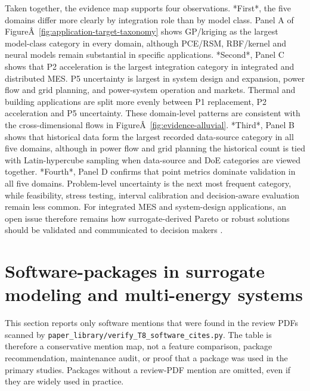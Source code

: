 \documentclass[final,5p,times,twocolumn]{elsarticle}
\begin{document}
Taken together, the evidence map supports four observations. *First*,
the five domains differ more clearly by integration role than by model
class. Panel A of
FigureÂ~\ref{fig:application-target-taxonomy} shows GP/kriging as the
largest model-class category in every domain, although PCE/RSM,
RBF/kernel and neural models remain substantial in specific
applications. *Second*, Panel C shows that P2 acceleration is the
largest integration category in integrated and distributed MES. P5
uncertainty is largest in system design and expansion, power flow and
grid planning, and power-system operation and markets. Thermal and
building applications are split more evenly between P1 replacement, P2
acceleration and P5 uncertainty. These
domain-level patterns are consistent with the cross-dimensional flows
in FigureÂ~\ref{fig:evidence-alluvial}. *Third*, Panel B shows that
historical data form the largest recorded data-source category in all
five domains, although in power flow and grid planning the historical
count is tied with Latin-hypercube sampling when data-source and DoE
categories are viewed together.
*Fourth*, Panel D confirms that point metrics dominate validation in all
five domains. Problem-level uncertainty is the next most frequent
category, while feasibility, stress testing, interval calibration and
decision-aware evaluation remain less common. For integrated MES and
system-design applications, an open issue therefore remains how
surrogate-derived Pareto or robust solutions should be validated and
communicated to decision makers
\cite{Mylonopoulos202332697,Lim2025}.

\section{Software-packages in surrogate modeling and multi-energy systems}
\label{sec:software}

This section reports only software mentions that were found in the review PDFs
scanned by \texttt{paper\_library/verify\_T8\_software\_cites.py}. The table is
therefore a conservative mention map, not a feature comparison, package
recommendation, maintenance audit, or proof that a package was used in the
primary studies. Packages without a review-PDF mention are omitted, even if
they are widely used in practice.
\end{document}
